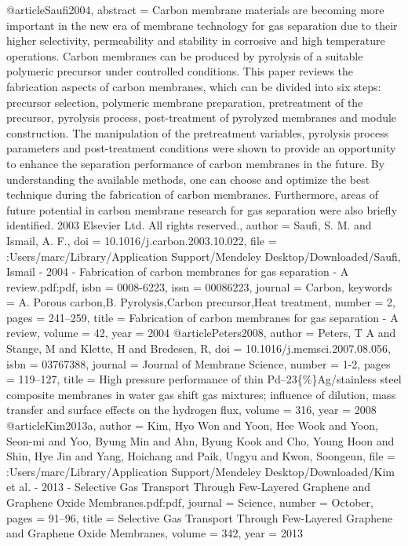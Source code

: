 @article{Saufi2004,
abstract = {Carbon membrane materials are becoming more important in the new era of membrane technology for gas separation due to their higher selectivity, permeability and stability in corrosive and high temperature operations. Carbon membranes can be produced by pyrolysis of a suitable polymeric precursor under controlled conditions. This paper reviews the fabrication aspects of carbon membranes, which can be divided into six steps: precursor selection, polymeric membrane preparation, pretreatment of the precursor, pyrolysis process, post-treatment of pyrolyzed membranes and module construction. The manipulation of the pretreatment variables, pyrolysis process parameters and post-treatment conditions were shown to provide an opportunity to enhance the separation performance of carbon membranes in the future. By understanding the available methods, one can choose and optimize the best technique during the fabrication of carbon membranes. Furthermore, areas of future potential in carbon membrane research for gas separation were also briefly identified. {\textcopyright} 2003 Elsevier Ltd. All rights reserved.},
author = {Saufi, S. M. and Ismail, A. F.},
doi = {10.1016/j.carbon.2003.10.022},
file = {:Users/marc/Library/Application Support/Mendeley Desktop/Downloaded/Saufi, Ismail - 2004 - Fabrication of carbon membranes for gas separation - A review.pdf:pdf},
isbn = {0008-6223},
issn = {00086223},
journal = {Carbon},
keywords = {A. Porous carbon,B. Pyrolysis,Carbon precursor,Heat treatment},
number = {2},
pages = {241--259},
title = {{Fabrication of carbon membranes for gas separation - A review}},
volume = {42},
year = {2004}
}
@article{Peters2008,
author = {Peters, T A and Stange, M and Klette, H and Bredesen, R},
doi = {10.1016/j.memsci.2007.08.056},
isbn = {03767388},
journal = {Journal of Membrane Science},
number = {1-2},
pages = {119--127},
title = {{High pressure performance of thin Pd–23{\{}{\%}{\}}Ag/stainless steel composite membranes in water gas shift gas mixtures; influence of dilution, mass transfer and surface effects on the hydrogen flux}},
volume = {316},
year = {2008}
}
@article{Kim2013a,
author = {Kim, Hyo Won and Yoon, Hee Wook and Yoon, Seon-mi and Yoo, Byung Min and Ahn, Byung Kook and Cho, Young Hoon and Shin, Hye Jin and Yang, Hoichang and Paik, Ungyu and Kwon, Soongeun},
file = {:Users/marc/Library/Application Support/Mendeley Desktop/Downloaded/Kim et al. - 2013 - Selective Gas Transport Through Few-Layered Graphene and Graphene Oxide Membranes.pdf:pdf},
journal = {Science},
number = {October},
pages = {91--96},
title = {{Selective Gas Transport Through Few-Layered Graphene and Graphene Oxide Membranes}},
volume = {342},
year = {2013}
}
